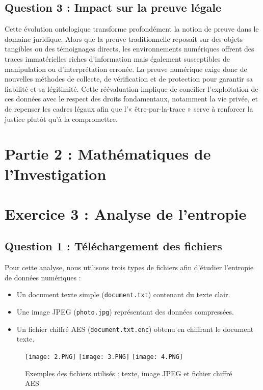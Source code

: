 \documentclass[12pt,a4paper]{report}
\begin{document}
	\subsection*{Question 3 : Impact sur la preuve légale}
	Cette évolution ontologique transforme profondément la notion de preuve dans le domaine juridique. Alors que la preuve traditionnelle reposait sur des objets tangibles ou des témoignages directs, les environnements numériques offrent des traces immatérielles riches d’information mais également susceptibles de manipulation ou d’interprétation erronée. La preuve numérique exige donc de nouvelles méthodes de collecte, de vérification et de protection pour garantir sa fiabilité et sa légitimité. Cette réévaluation implique de concilier l’exploitation de ces données avec le respect des droits fondamentaux, notamment la vie privée, et de repenser les cadres légaux afin que l’« être-par-la-trace » serve à renforcer la justice plutôt qu’à la compromettre.
	

	\section*{Partie 2 : Mathématiques de l'Investigation}

	
	\section*{Exercice 3 : Analyse de l'entropie}
	
	\subsection*{Question 1 : Téléchargement des fichiers}
	
	Pour cette analyse, nous utilisons trois types de fichiers afin d’étudier l’entropie de données numériques : 
	
	\begin{itemize}
		\item Un document texte simple (\texttt{document.txt}) contenant du texte clair.
		\item Une image JPEG (\texttt{photo.jpg}) représentant des données compressées.
		\item Un fichier chiffré AES (\texttt{document.txt.enc}) obtenu en chiffrant le document texte.
	\end{itemize}
	
	\begin{figure}[H]
		\centering
		\texttt{[image: 2.PNG]} 
		\hfill
		\texttt{[image: 3.PNG]} 
		\hfill
		\texttt{[image: 4.PNG]} 
		\caption{Exemples des fichiers utilisés : texte, image JPEG et fichier chiffré AES}
		\label{fig:files_examples}
	\end{figure}
	
\end{document}
